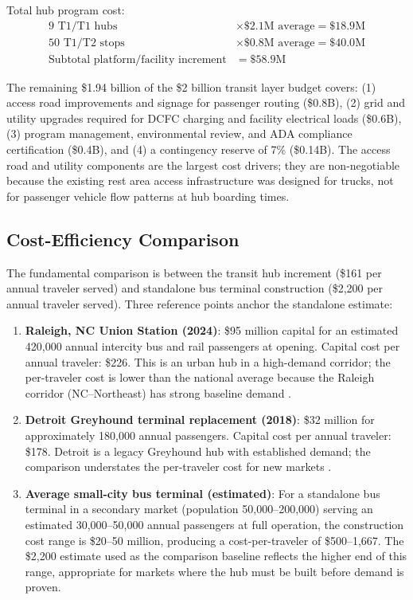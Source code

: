 Total hub program cost:
\begin{align*}
\text{9 T1/T1 hubs} &\times \$2.1\text{M average} = \$18.9\text{M} \\
\text{50 T1/T2 stops} &\times \$0.8\text{M average} = \$40.0\text{M} \\
\text{Subtotal platform/facility increment} &= \$58.9\text{M}
\end{align*}

The remaining \$1.94 billion of the \$2 billion transit layer budget covers: (1) access road improvements and signage for passenger routing (\$0.8B), (2) grid and utility upgrades required for DCFC charging and facility electrical loads (\$0.6B), (3) program management, environmental review, and ADA compliance certification (\$0.4B), and (4) a contingency reserve of 7\% (\$0.14B). The access road and utility components are the largest cost drivers; they are non-negotiable because the existing rest area access infrastructure was designed for trucks, not for passenger vehicle flow patterns at hub boarding times.

\subsection{Cost-Efficiency Comparison}

The fundamental comparison is between the transit hub increment (\$161 per annual traveler served) and standalone bus terminal construction (\$2,200 per annual traveler served). Three reference points anchor the standalone estimate:

\begin{enumerate}
  \item \textbf{Raleigh, NC Union Station (2024)}: \$95 million capital for an estimated 420,000 annual intercity bus and rail passengers at opening. Capital cost per annual traveler: \$226. This is an urban hub in a high-demand corridor; the per-traveler cost is lower than the national average because the Raleigh corridor (NC--Northeast) has strong baseline demand \citep{Amtrak2023}.
  \item \textbf{Detroit Greyhound terminal replacement (2018)}: \$32 million for approximately 180,000 annual passengers. Capital cost per annual traveler: \$178. Detroit is a legacy Greyhound hub with established demand; the comparison understates the per-traveler cost for new markets \citep{BTS_intermodal2023}.
  \item \textbf{Average small-city bus terminal (estimated)}: For a standalone bus terminal in a secondary market (population 50,000--200,000) serving an estimated 30,000--50,000 annual passengers at full operation, the construction cost range is \$20--50 million, producing a cost-per-traveler of \$500--1,667. The \$2,200 estimate used as the comparison baseline reflects the higher end of this range, appropriate for markets where the hub must be built before demand is proven.
\end{enumerate}

